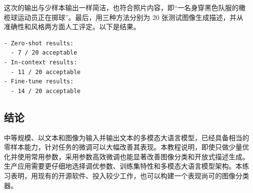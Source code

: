 这次的输出与少样本输出一样简洁，也符合照片内容，即“一名身穿黑色队服的橄榄球运动员正在掷球”。最后，用三种方法分别为 20 张测试图像生成描述，并从准确性和风格两方面人工评定。以下是结果。

\noindent\begin{minipage}{\linewidth}
\begin{lstlisting}[caption={测试集图像描述生成结果。},label={lst:ch09-caption-results}]
- Zero-shot results:
  - 7 / 20 acceptable
- In-context results:
  - 11 / 20 acceptable
- Fine-tune results:
  - 14 / 20 acceptable
\end{lstlisting}
\end{minipage}\par

\subsection{结论}
中等规模、以文本和图像为输入并输出文本的多模态大语言模型，已经具备相当的零样本能力，针对任务的微调可以大幅改善其表现。本教程说明，即使只做少量优化并使用常用参数，采用参数高效微调也能显著改善图像分类和开放式描述生成。生产应用需要更仔细地选择调优参数、训练集特性和多模态大语言模型架构。本练习表明，用现有的开源软件、投入较少工作，也可以构建一个表现尚可的图像分类器。

